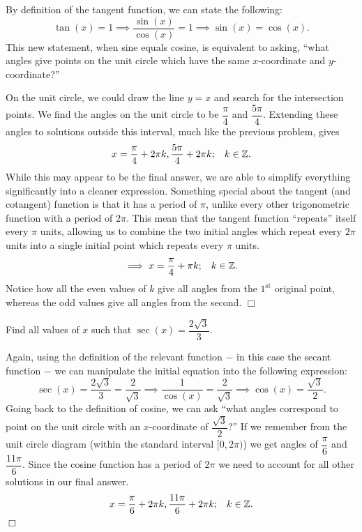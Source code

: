 \documentclass[../book.tex]{subfiles}
\begin{document}
\begin{solution}
By definition of the tangent function, we can state the following: $$\tan(x)=1\implies \dfrac{\sin(x)}{\cos(x)}=1 \implies \sin(x)=\cos(x).$$ 
This new statement, when sine equals cosine, is equivalent to asking, “what angles give points on the unit circle which have the same $x$-coordinate and $y$-coordinate?”

On the unit circle, we could draw the line $y=x$ and search for the intersection points. We find the angles on the unit circle to be $\dfrac{\pi}{4}$ and $\dfrac{5\pi}{4}$. Extending these angles to solutions outside this interval, much like the previous problem, gives $$x=\dfrac{\pi}{4}+2\pi k,\dfrac{5\pi}{4}+2\pi k;\hspace{3mm} k\in\mathbb{Z}.$$ While this may appear to be the final answer, we are able to simplify everything significantly into a cleaner expression. Something special about the tangent (and cotangent) function is that it has a period of $\pi$, unlike every other trigonometric function with a period of $2\pi$. This mean that the tangent function “repeats” itself every $\pi$ units, allowing us to combine the two initial angles which repeat every $2\pi$ units into a single initial point which repeats every $\pi$ units. $$\implies x=\dfrac{\pi}{4}+\pi k;\hspace{3mm} k\in\mathbb{Z}.$$ Notice how all the even values of $k$ give all angles from the $1^\text{st}$ original point, whereas the odd values give all angles from the second. $\Box$
\end{solution}
\begin{example}
Find all values of $x$ such that $\sec(x)=\dfrac{2\sqrt{3}}{3}$.
\end{example}
\begin{solution}
Again, using the definition of the relevant function $-$ in this case the secant function $-$ we can manipulate the initial equation into the following expression: $$\sec(x)=\dfrac{2\sqrt{3}}{3}=\dfrac{2}{\sqrt{3}} \implies \dfrac{1}{\cos(x)}=\dfrac{2}{\sqrt{3}}\implies \cos(x)=\dfrac{\sqrt{3}}{2}.$$ Going back to the definition of cosine, we can ask “what angles correspond to point on the unit circle with an $x$-coordinate of $\dfrac{\sqrt{3}}{2}$?” If we remember from the unit circle diagram (within the standard interval $[0,2\pi)$) we get angles of $\dfrac{\pi}{6}$ and $\dfrac{11\pi}{6}$. Since the cosine function has a period of $2\pi$ we need to account for all other solutions in our final answer. $$x=\dfrac{\pi}{6}+2\pi k,\dfrac{11\pi}{6}+2\pi k; \hspace{3mm} k\in\mathbb{Z}.$$ $\Box$
\end{solution}
\end{document}
